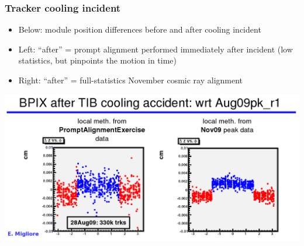 \documentclass[compress]{beamer}
\begin{document}
\begin{frame}
\frametitle{Tracker cooling incident}

\begin{itemize}
\item Below: module position differences before and after cooling incident

\item Left: ``after'' = prompt alignment performed immediately after
  incident (low statistics, but pinpoints the motion in time)

\item Right: ``after'' = full-statistics November cosmic ray alignment
\end{itemize}

\includegraphics[width=\linewidth]{pxb_motion.png}
\end{frame}
\end{document}
